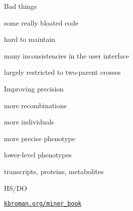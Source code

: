 \documentclass[12pt,t,aspectratio=169]{beamer}
\begin{document}
\begin{frame}{Bad things}

  \bbi
\item some really bloated code
\item hard to maintain
\item many inconsistencies in the user interface
\item largely restricted to two-parent crosses
  \ei

\end{frame}







\begin{frame}[c]{Improving precision}

  \vspace{-20mm}

  \bbi
\item more recombinations
\item more individuals
\item more precise phenotype
\item lower-level phenotypes
\bi
\item transcripts, proteins, metabolites
  \ei
  \ei

\end{frame}



\begin{frame}[c]{HS/DO}

  \vspace{2mm}


\end{frame}





\begin{frame}[c]{}

  \vspace*{5mm}



\vspace{3mm}

\hfill \href{https://kbroman.org/miner_book}{\scriptsize \lolit \tt kbroman.org/miner\_book}

\end{frame}
\end{document}
